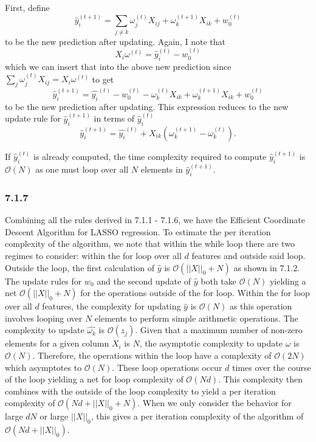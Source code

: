 \documentclass[12pt]{amsart}
\begin{document}
First, define
\begin{equation}
\hat{y}_i^{(t+1)} = \sum_{j \neq k} \omega_j^{(t)}X_{ij} + \omega_k^{(t+1)}X_{ik} + w_0^{(t)}
\end{equation}
to be the new prediction after updating.
Again, I note that 
\begin{equation}
X_i \omega^{(t)} = \hat{y}_i^{(t)} - w_0^{(t)}
\end{equation}
which we can insert that into the above new prediction since $\sum_{j} \omega_j^{(t)}X_{ij} = X_i \omega^{(t)} $ to get 
\begin{equation}
\hat{y}_i^{(t+1)} = \hat{y_i}^{(t)} - w_0^{(t)} - \omega_k^{(t)}X_{ik} + \omega_k^{(t+1)}X_{ik} + w_0^{(t)}
\end{equation}
to be the new prediction after updating.  This expression reduces to the new update rule for $\hat{y}_i^{(t+1)}$ in terms of $\hat{y}_i^{(t)}$
\begin{equation}
\hat{y}_i^{(t+1)} = \hat{y_i}^{(t)} + X_{ik}(\omega_k^{(t+1)} - \omega_k^{(t)}).
\end{equation}

If $\hat{y}_i^{(t)}$ is already computed, the time complexity required to compute $\hat{y}_i^{(t+1)}$ is $\mathcal{O}(N)$ as one must loop over all $N$ elements in $\hat{y}_i^{(t+1)}$.

\subsubsection*{7.1.7}

Combining all the rules derived in 7.1.1 - 7.1.6, we have the Efficient Coordinate Descent Algorithm for LASSO regression.  To estimate the per iteration complexity of the algorithm, we note that within the while loop there are two regimes to consider: within the for loop over all $d$ features and outside said loop.  Outside the loop, the first calculation of $\hat{y}$ is $\mathcal{O}(||X||_0 + N)$ as shown in 7.1.2.  The update rules for $w_0$ and the second update of $\hat{y}$ both take $\mathcal{O}(N)$ yielding a net $\mathcal{O}(||X||_0 + N)$ for the operations outside of the for loop.  Within the for loop over all $d$ features, the complexity for updating $\hat{y}$ is $\mathcal{O}(N)$ as this operation involves looping over $N$ elements to perform simple arithmetic operations.  The complexity to update $\hat{\omega_k}$ is $\mathcal{O}(z_j)$.  Given that a maximum number of non-zero elements for a given column $X_i$ is $N$, the asymptotic complexity to update $\hat{\omega}$ is $\mathcal{O}(N)$.  Therefore, the operations within the loop have a complexity of $\mathcal{O}(2N)$ which asymptotes to $\mathcal{O}(N)$.  These loop operations occur $d$ times over the course of the loop yielding a net for loop complexity of $\mathcal{O}(Nd)$.  This complexity then combines with the outside of the loop complexity to yield a per iteration complexity of $\mathcal{O}(Nd + ||X||_0 + N)$.  When we only consider the behavior for large $dN$ or large $||X||_0$, this gives a per iteration complexity of the algorithm of $\mathcal{O}(Nd + ||X||_0)$.
\end{document}
